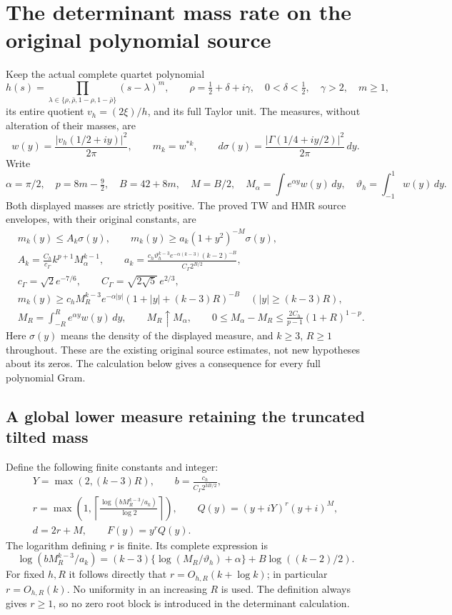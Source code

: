 \section{The determinant mass rate on the original polynomial source}
\label{sec:dmr-independent}

Keep the actual complete quartet polynomial
\[
 h(s)=\prod_{\lambda\in\{\rho,\bar\rho,1-\rho,1-\bar\rho\}}(s-\lambda)^m,
 \qquad \rho=\tfrac12+\delta+i\gamma,\quad
 0<\delta<\tfrac12,\quad \gamma>2,\quad m\geq1,
\]
its entire quotient $v_h=(2\xi)/h$, and its full Taylor unit.
The measures, without alteration of their masses, are
\[
 w(y)=\frac{|v_h(1/2+iy)|^2}{2\pi},\qquad m_k=w^{*k},
 \qquad d\sigma(y)=\frac{|\Gamma(1/4+iy/2)|^2}{2\pi}\,dy.
 \tag{DMR1}
\]
Write
\[
 \alpha=\pi/2,\quad p=8m-\tfrac92,\quad B=42+8m,\quad M=B/2,
 \quad M_\alpha=\int e^{\alpha y}w(y)\,dy,\quad
 \vartheta_h=\int_{-1}^1w(y)\,dy.
\]
Both displayed masses are strictly positive. The proved TW and HMR
source envelopes, with their original constants, are
\[
 \begin{split}
 &m_k(y)\leq A_k\sigma(y),\qquad
 m_k(y)\geq a_k(1+y^2)^{-M}\sigma(y),\\
 &A_k=\frac{C_h}{c_\Gamma}k^{p+1}M_\alpha^{k-1},\qquad
 a_k=\frac{c_h\vartheta_h^{k-3}e^{-\alpha(k-3)}(k-2)^{-B}}
                  {C_\Gamma 2^{B/2}},\\
 &c_\Gamma=\sqrt2 e^{-7/6},\qquad
 C_\Gamma=\sqrt{2\sqrt5}\,e^{2/3},\\
 &m_k(y)\geq c_h M_R^{k-3}e^{-\alpha|y|}
              (1+|y|+(k-3)R)^{-B}\quad
                         (|y|\geq(k-3)R),\\
 &M_R=\int_{-R}^R e^{\alpha y}w(y)\,dy,\qquad
 M_R\uparrow M_\alpha,\qquad
 0\leq M_\alpha-M_R\leq
       \frac{2C_h}{p-1}(1+R)^{1-p}.
 \end{split}\tag{DMR2}
\]
Here $\sigma(y)$ means the density of the displayed measure,
and $k\geq3$, $R\geq1$ throughout. These are the existing original
source estimates, not new hypotheses about its zeros. The calculation
below gives a consequence for every full polynomial Gram.

\subsection{A global lower measure retaining the truncated tilted mass}

Define the following finite constants and integer:
\[
 \begin{gathered}
 Y=\max(2,(k-3)R),\qquad b=\frac{c_h}{C_\Gamma 2^{3B/2}},\\
 r=\max\left(1,\left\lceil
       \frac{\log(bM_R^{k-3}/a_k)}{\log2}\right\rceil\right),\qquad
 Q(y)=(y+iY)^r(y+i)^M,\\
 d=2r+M,\qquad F(y)=y^rQ(y).
 \end{gathered}\tag{DMR3}
\]
The logarithm defining $r$ is finite. Its complete expression is
\[
 \log(bM_R^{k-3}/a_k)
 =(k-3)\{\log(M_R/\vartheta_h)+\alpha\}
                    +B\log((k-2)/2).
 \tag{DMR4}
\]
For fixed $h,R$ it follows directly that $r=O_{h,R}(k+\log k)$;
in particular $r=O_{h,R}(k)$. No uniformity in an increasing $R$
is used. The definition always gives $r\geq1$, so no zero
root block is introduced in the determinant calculation.

